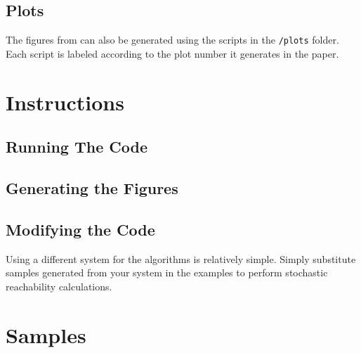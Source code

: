 \documentclass[11pt]{article}
\begin{document}
\subsection{Plots}

The figures from \cite{thorpe2019stochastic} can also be generated using the scripts in the \verb|/plots| folder. Each script is labeled according to the plot number it generates in the paper.


\section{Instructions}
\label{section: instructions}

\subsection{Running The Code}

\subsection{Generating the Figures}


\subsection{Modifying the Code}

Using a different system for the algorithms is relatively simple. Simply substitute samples generated from your system in the examples to perform stochastic reachability calculations.


\section{Samples}
\label{section: samples}
\end{document}
